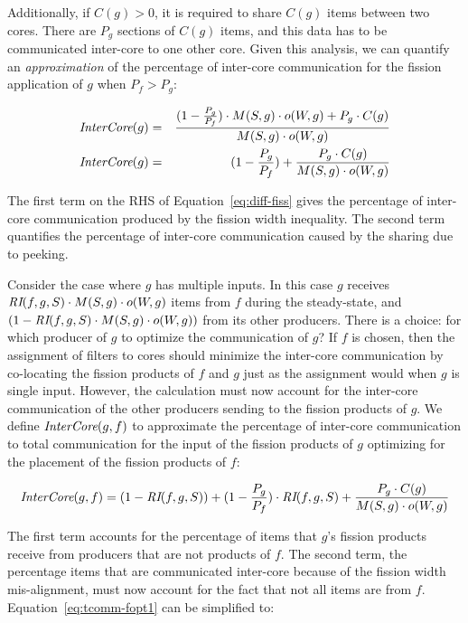 Additionally, if $C(g) > 0$, it is required to share $C(g)$ items
between two cores.  There are $P_g$ sections of $C(g)$ items, and this
data has to be communicated inter-core to one other core.  Given this
analysis, we can quantify an {\it approximation} of the percentage of
inter-core communication for the fission application of $g$ when $P_f
> P_g$:

\begin{align}
\mbox{\it InterCore}(g) & = & \frac{(1 - \frac{P_g}{P_f}) \cdot M(S, g) \cdot o(W, g) +
P_g \cdot C(g)}{M(S, g) \cdot o(W, g)} \\
\label{eq:diff-fiss}
\mbox{\it InterCore}(g) & = & (1 - \frac{P_g}{P_f}) +
\frac{P_g \cdot C(g)}{M(S, g) \cdot o(W, g)}
\end{align}

The first term on the RHS of Equation~\ref{eq:diff-fiss} gives the
percentage of inter-core communication produced by the fission width
inequality.  The second term quantifies the percentage of inter-core
communication caused by the sharing due to peeking.  

Consider the case where $g$ has multiple inputs. In this case $g$
receives $\mbox{\it RI}(f, g, S) \cdot M(S, g) \cdot o(W,g)$ items from $f$
during the steady-state, and $(1 -\mbox{\it RI}(f, g, S) \cdot M(S, g) \cdot
o(W,g))$ from its other producers. There is a choice: for which
producer of $g$ to optimize the communication of $g$? If $f$ is
chosen, then the assignment of filters to cores should minimize the
inter-core communication by co-locating the fission products of $f$
and $g$ just as the assignment would when $g$ is single input.
However, the calculation must now account for the inter-core
communication of the other producers sending to the fission products
of $g$. We define $\mbox{\it InterCore}(g, f)$ to approximate the percentage
of inter-core communication to total communication for the input of
the fission products of $g$ optimizing for the placement of the
fission products of $f$:

\begin{equation}
\label{eq:tcomm-fopt1}
 \mbox{\it InterCore}(g,f)   = (1 - \mbox{\it RI}(f,
   g, S))  + (1 - \frac{P_g}{P_f}) \cdot \mbox{\it RI}(f,
   g, S)   + \frac{P_g \cdot C(g)}{M(S, g) \cdot o(W, g)} 
\end{equation}

\noindent The first term accounts for the percentage of items that $g$'s fission
products receive from producers that are not products of $f$.  The
second term, the percentage items that are communicated inter-core
because of the fission width mis-alignment, must now account for the
fact that not all items are from $f$.  Equation~\ref{eq:tcomm-fopt1}
can be simplified to:


